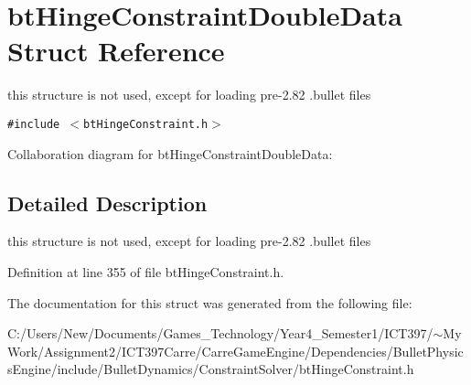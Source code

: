 \hypertarget{structbt_hinge_constraint_double_data}{
\section{btHingeConstraintDoubleData Struct Reference}
\label{structbt_hinge_constraint_double_data}
}
this structure is not used, except for loading pre-2.82 .bullet files  


{\tt \#include $<$btHingeConstraint.h$>$}

Collaboration diagram for btHingeConstraintDoubleData:

\subsection{Detailed Description}
this structure is not used, except for loading pre-2.82 .bullet files 

Definition at line 355 of file btHingeConstraint.h.

The documentation for this struct was generated from the following file:\begin{CompactItemize}
\item 
C:/Users/New/Documents/Games\_\-Technology/Year4\_\-Semester1/ICT397/$\sim$My Work/Assignment2/ICT397Carre/CarreGameEngine/Dependencies/BulletPhysicsEngine/include/BulletDynamics/ConstraintSolver/btHingeConstraint.h\end{CompactItemize}
